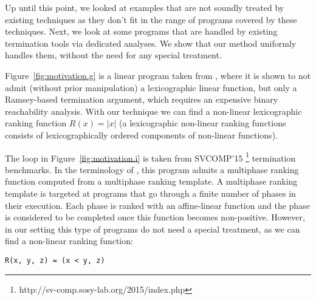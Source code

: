 \documentclass[preprint]{sigplanconf}
\theoremstyle{definition}
\begin{document}
Up until this point, we looked at examples that are not soundly treated by existing techniques as they 
don't fit in the range of programs covered by these techniques.
Next, we look at some programs that are handled by existing termination tools via dedicated analyses. We show that our method 
uniformly handles them, without the need for any special treatment.




Figure~\ref{fig:motivation.g} is a linear program taken from \cite{DBLP:conf/tacas/CookSZ13}, 
where it is shown to not admit (without prior manipulation) a lexicographic linear function, but only a Ramsey-based termination argument,
which requires an expensive binary reachability analysis.
With our technique we can find a non-linear lexicographic ranking function $R(x) = |x|$ 
(a lexicographic non-linear ranking functions consists of lexicographically ordered components
of non-linear functions). 


The loop in Figure~\ref{fig:motivation.i} is taken from SVCOMP'15  \footnote{http://sv-comp.sosy-lab.org/2015/index.php} termination benchmarks.
In the terminology of \cite{DBLP:conf/tacas/LeikeH14}, this program admits a multiphase ranking function computed from a multiphase ranking template.
A multiphase ranking template is targeted at programs that go through a
finite number of phases in their execution. Each phase is ranked with
an affine-linear function and the phase is considered to be completed once this
function becomes non-positive.
However, in our setting this type of programs do not need a special treatment, as we can find a non-linear ranking function:
\begin{verbatim}
R(x, y, z) = (x < y, z)
\end{verbatim}
\end{document}
